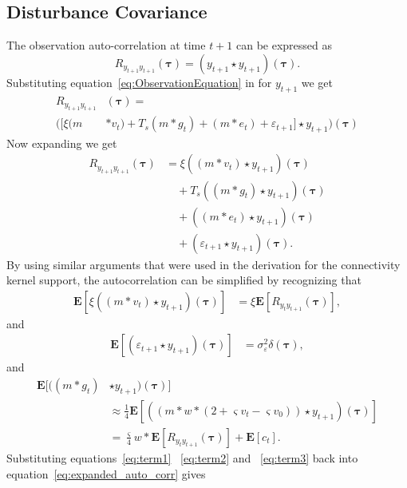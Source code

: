 \documentclass[conference,onecolumn]{IEEEtran}
\begin{document}
\subsection{Disturbance Covariance}
The observation auto-correlation at time $t+1$ can be expressed as
\begin{equation}
	R_{y_{t+1}y_{t+1}}(\boldsymbol{\tau})=(y_{t+1} \star y_{t+1})(\boldsymbol\tau).
\end{equation}
Substituting equation~\ref{eq:ObservationEquation} in for $y_{t+1}$ we get
\begin{align}
	R_{y_{t+1}y_{t+1}}&(\boldsymbol{\tau}) = \\ \nonumber 
	([\xi(m &\ast v_{t}) + T_s(m\ast g_{t})+(m\ast e_{t})+\varepsilon_{t+1}] \star  y_{t+1})(\boldsymbol{\tau})
\end{align}
Now expanding we get
\begin{align}\label{eq:expanded_auto_corr}
	R_{y_{t+1}y_{t+1}}(\boldsymbol{\tau}) &= \xi((m \ast v_{t}) \star y_{t+1})(\boldsymbol{\tau}) \nonumber \\
	&\quad+T_s((m\ast g_{t})\star y_{t+1})(\boldsymbol{\tau}) \nonumber \\
	&\quad+((m\ast e_{t})\star  y_{t+1})(\boldsymbol{\tau}) \nonumber \\
	&\quad+(\varepsilon_{t+1} \star y_{t+1})(\boldsymbol{\tau}).
\end{align}
By using similar arguments that were used in the derivation for the connectivity kernel support, the autocorrelation can be simplified by recognizing that
\begin{align}\label{eq:term1}
  \mathbf{E}[\xi((m\ast v_{t})\star y_{t+1})(\boldsymbol{\tau})]&=\xi \mathbf{E}[ R_{y_ty_{t+1}}(\boldsymbol{\tau})],
\end{align}
and
\begin{align}\label{eq:term2}
 \mathbf{E}[(\varepsilon_{t+1}\star y_{t+1})(\boldsymbol\tau)]&=\sigma_{\varepsilon}^2\delta(\boldsymbol{\tau}),
\end{align}
and
\begin{align}\label{eq:term3}
	\mathbf{E}[((m\ast g_t) &\star y_{t+1})(\boldsymbol\tau)] \\ 
	&\approx \frac{1}{4}\mathbf{E}[((m \ast w \ast (2 + \varsigma v_t - \varsigma v_0))\star y_{t+1})(\boldsymbol\tau)] \\
	&= \frac{\varsigma}{4} w \ast \mathbf{E}[R_{y_ty_{t+1}}(\boldsymbol\tau)]  + \mathbf{E}[c_t].
\end{align}
Substituting equations~\ref{eq:term1} ~\ref{eq:term2} and ~\ref{eq:term3} back into equation~\ref{eq:expanded_auto_corr} gives
\end{document}
